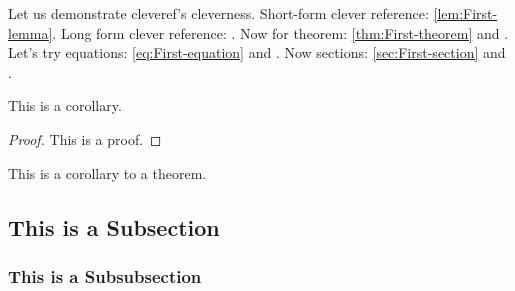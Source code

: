 \documentclass{article}
\begin{document}
Let us demonstrate cleveref's cleverness. Short-form clever reference: \cref{lem:First-lemma}. Long form clever reference: . Now for theorem: \cref{thm:First-theorem} and . Let's try equations: \cref{eq:First-equation} and . Now sections: \cref{sec:First-section} and .

\begin{cor}\label{cor:First-corollary}
This is a corollary.

\end{cor}

\begin{proof}
This is a proof.
%
\end{proof}

\begin{cor}
This is a corollary to a theorem.
%
\end{cor}

\lipsum[1-5]

\subsection{This is a Subsection}

\lipsum[6-10]

\subsubsection{This is a Subsubsection}
\lipsum[11-20]

\nocite{*}
\printbibliography

\end{document}

